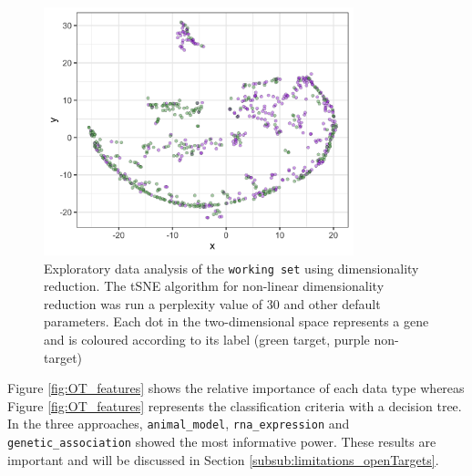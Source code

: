 \begin{figure}[H]
\centering
    \includegraphics[width=9cm]{pics/tSNE.png}
    \caption{Exploratory data analysis of the \texttt{working set} using dimensionality reduction. The tSNE algorithm for non-linear dimensionality reduction was run a perplexity value of 30 and other default parameters. Each dot in the two-dimensional space represents a gene and is coloured according to its label (green target, purple non-target)}
    \label{fig:OT_tSNE}
\end{figure}

Figure \ref{fig:OT_features} shows the relative importance of each data type whereas Figure \ref{fig:OT_features} represents the classification criteria with a decision tree. In the three approaches, \texttt{animal\_model}, \texttt{rna\_expression} and \texttt{genetic\_association} showed the most informative power. These results are important and will be discussed in Section \ref{subsub:limitations_openTargets}.

